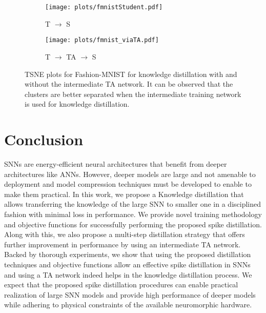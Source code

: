 \documentclass{article}
\begin{document}
\begin{figure}[t]
\begin{center}
	\begin{subfigure}{0.48\textwidth}
	\texttt{[image: plots/fmnistStudent.pdf]}
	\caption{T $\rightarrow$ S}
	\end{subfigure}
	\begin{subfigure}{0.48\textwidth}
	\texttt{[image: plots/fmnist\_viaTA.pdf]}
	\caption{T $\rightarrow$ TA $\rightarrow$ S}
	\end{subfigure}
\end{center}
\caption{TSNE plots for Fashion-MNIST for knowledge distillation with and without the intermediate TA network. It can be observed that the clusters are better separated when the intermediate training network is used for knowledge distillation.}
\label{fig:fmnistTSNEs}
\end{figure}

\section{Conclusion}
SNNs are energy-efficient neural architectures that benefit from deeper architectures like ANNs. However, deeper models are large and not amenable to deployment and model compression techniques must be developed to enable to make them practical. In this work, we propose a Knowledge distillation that allows transferring the knowledge of the large SNN to smaller one in a disciplined fashion with minimal loss in performance. We provide novel training methodology and objective functions for successfully performing the proposed spike distillation. Along with this, we also propose a multi-step distillation strategy that offers further improvement in performance by using an intermediate TA network. Backed by thorough experiments, we show that using the proposed distillation techniques and objective functions allow an effective spike distillation in SNNs and using a TA network indeed helps in the knowledge distillation process. We expect that the proposed spike distillation procedures can enable practical realization of large SNN models and provide high performance of deeper models while adhering to physical constraints of the available neuromorphic hardware.





\end{document}

